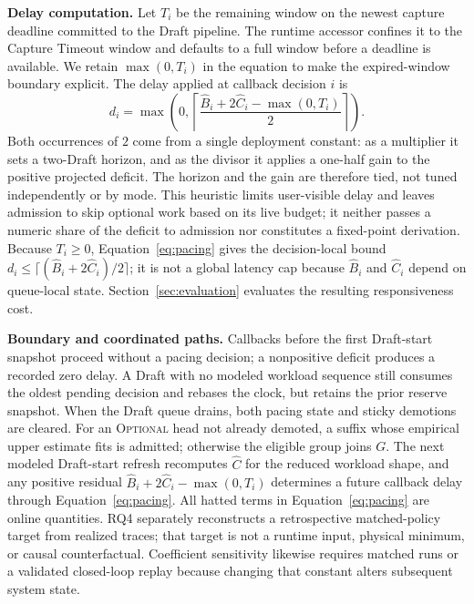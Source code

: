 \smallskip\noindent\textbf{Delay computation.}
Let \(T_i\) be the remaining window on the newest capture deadline committed to the Draft pipeline.
The runtime accessor confines it to the Capture Timeout window and defaults to a full window before a deadline is available.
We retain \(\max(0,T_i)\) in the equation to make the expired-window boundary explicit.
The delay applied at callback decision \(i\) is
\begin{equation}
  d_i = \max\!\left(
    0,
    \left\lceil
      \frac{\hat B_i+2\hat C_i-\max(0,T_i)}{2}
    \right\rceil
  \right).
  \label{eq:pacing}
\end{equation}
Both occurrences of \(2\) come from a single deployment constant: as a multiplier it sets a two-Draft horizon, and as the divisor it applies a one-half gain to the positive projected deficit.
The horizon and the gain are therefore tied, not tuned independently or by mode.
This heuristic limits user-visible delay and leaves admission to skip optional work based on its live budget; it neither passes a numeric share of the deficit to admission nor constitutes a fixed-point derivation.
Because \(T_i\geq0\), Equation~\ref{eq:pacing} gives the decision-local bound \(d_i\leq\lceil(\hat B_i+2\hat C_i)/2\rceil\); it is not a global latency cap because \(\hat B_i\) and \(\hat C_i\) depend on queue-local state.
Section~\ref{sec:evaluation} evaluates the resulting responsiveness cost.

\smallskip\noindent\textbf{Boundary and coordinated paths.}
Callbacks before the first Draft-start snapshot proceed without a pacing decision; a nonpositive deficit produces a recorded zero delay.
A Draft with no modeled workload sequence still consumes the oldest pending decision and rebases the clock, but retains the prior reserve snapshot.
When the Draft queue drains, both pacing state and sticky demotions are cleared.
For an \textsc{Optional} head not already demoted, a suffix whose empirical upper estimate fits is admitted; otherwise the eligible group joins \(G\).
The next modeled Draft-start refresh recomputes \(\hat C\) for the reduced workload shape, and any positive residual \(\hat B_i+2\hat C_i-\max(0,T_i)\) determines a future callback delay through Equation~\ref{eq:pacing}.
All hatted terms in Equation~\ref{eq:pacing} are online quantities.
RQ4 separately reconstructs a retrospective matched-policy target from realized traces; that target is not a runtime input, physical minimum, or causal counterfactual.
Coefficient sensitivity likewise requires matched runs or a validated closed-loop replay because changing that constant alters subsequent system state.
